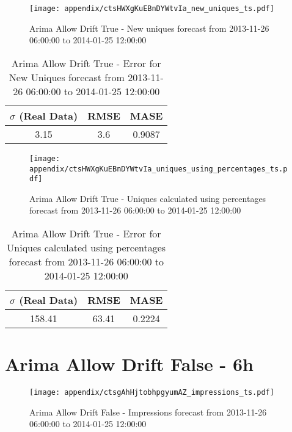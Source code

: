 \begin{figure}[H] \begin{center} \leavevmode
\texttt{[image: appendix/ctsHWXgKuEBnDYWtvIa\_new\_uniques\_ts.pdf]} \caption{
Arima Allow Drift True - New uniques forecast from 2013-11-26 06:00:00 to 2014-01-25 12:00:00} \label{fig:appendix/ctsHWXgKuEBnDYWtvIa_new_uniques_ts.pdf} \end{center}
\end{figure}

\begin{table}[H]
\centering
\footnotesize
\begin{tabular}{ccc}
$\sigma$ (Real Data) & RMSE & MASE   \\ \hline
3.15 & 3.6 & 0.9087 \\
\end{tabular}

\vspace{0.5cm}

\caption{
Arima Allow Drift True - Error for New Uniques forecast from 2013-11-26 06:00:00 to 2014-01-25 12:00:00}
\end{table}

\begin{figure}[H] \begin{center} \leavevmode
\texttt{[image: appendix/ctsHWXgKuEBnDYWtvIa\_uniques\_using\_percentages\_ts.pdf]} \caption{
Arima Allow Drift True - Uniques calculated using percentages forecast from 2013-11-26 06:00:00 to 2014-01-25 12:00:00} \label{fig:appendix/ctsHWXgKuEBnDYWtvIa_uniques_using_percentages_ts.pdf} \end{center}
\end{figure}

\begin{table}[H]
\centering
\footnotesize
\begin{tabular}{ccc}
$\sigma$ (Real Data) & RMSE & MASE   \\ \hline
158.41 & 63.41 & 0.2224 \\
\end{tabular}

\vspace{0.5cm}

\caption{
Arima Allow Drift True - Error for Uniques calculated using percentages forecast from 2013-11-26 06:00:00 to 2014-01-25 12:00:00}
\end{table}

\section{Arima Allow Drift False - 6h}
\begin{figure}[H] \begin{center} \leavevmode
\texttt{[image: appendix/ctsgAhHjtobhpgyumAZ\_impressions\_ts.pdf]} \caption{
Arima Allow Drift False - Impressions forecast from 2013-11-26 06:00:00 to 2014-01-25 12:00:00} \label{fig:appendix/ctsgAhHjtobhpgyumAZ_impressions_ts.pdf} \end{center}
\end{figure}

